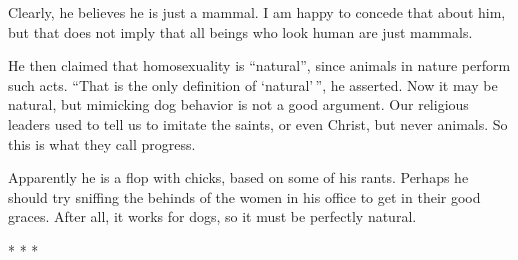 Clearly, he believes he is just a mammal. I am happy to concede that about him, but that does not imply that all beings who look human are just mammals.

He then claimed that homosexuality is ``natural'', since animals in nature perform such acts. ``That is the only definition of `natural'\,'', he asserted. Now it may be natural, but mimicking dog behavior is not a good argument. Our religious leaders used to tell us to imitate the saints, or even Christ, but never animals. So this is what they call progress.

Apparently he is a flop with chicks, based on some of his rants. Perhaps he should try sniffing the behinds of the women in his office to get in their good graces. After all, it works for dogs, so it must be perfectly natural.



\begin{center}* * *\end{center}

